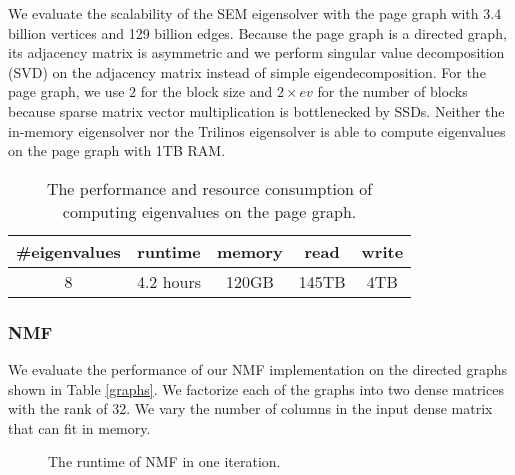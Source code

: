 
We evaluate the scalability of the SEM eigensolver with the page graph with 3.4 billion
vertices and 129 billion edges. Because the page graph is a directed graph,
its adjacency matrix is asymmetric and we perform singular value decomposition
(SVD) on the adjacency matrix instead of simple eigendecomposition. For the page
graph, we use $2$ for the block size and $2 \times ev$ for the number of blocks
because sparse matrix vector multiplication is bottlenecked by SSDs.
Neither the in-memory eigensolver nor the Trilinos eigensolver is able
to compute eigenvalues on the page graph with 1TB RAM.

\begin{table}
	\begin{center}
		\small
		\begin{tabular}{|c|c|c|c|c|}
			\hline
			\#eigenvalues & runtime & memory & read & write \\
			\hline
			8 & 4.2 hours & 120GB & 145TB & 4TB \\
			\hline
		\end{tabular}
		\normalsize
	\end{center}
	\caption{The performance and resource consumption of computing eigenvalues
	on the page graph.}
	\label{pg_ev}
\end{table}


\subsubsection{NMF}
We evaluate the performance of our NMF implementation on the directed graphs
shown in Table \ref{graphs}. We factorize each of the graphs into two dense
matrices with the rank of 32. We vary the number of columns in the input dense
matrix that can fit in memory.

\begin{figure}
	\begin{center}
		\footnotesize
		
		\caption{The runtime of NMF in one iteration.}
		\label{perf:NMF}
	\end{center}
\end{figure}
